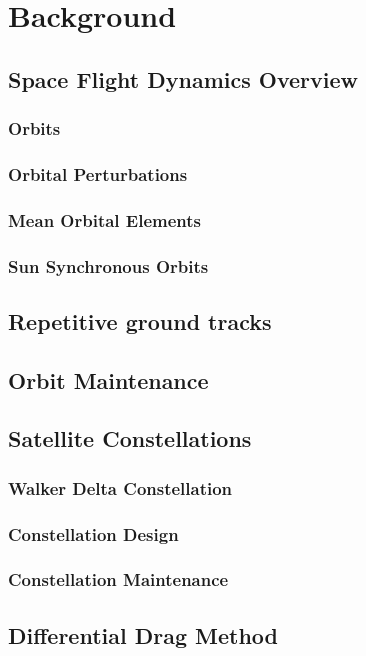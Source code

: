 \chapter{Background}

\section{Space Flight Dynamics Overview}

\subsection{Orbits}
\subsection{Orbital Perturbations}
\subsection{Mean Orbital Elements}
\subsection{Sun Synchronous Orbits}



\section{Repetitive ground tracks}


\section{Orbit Maintenance}


\section{Satellite Constellations}
\subsection{Walker Delta Constellation}
\subsection{Constellation Design}
\subsection{Constellation Maintenance}


\section{Differential Drag Method}


